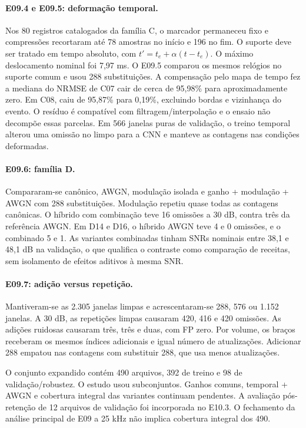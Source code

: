 \documentclass[11pt,a4paper]{article}
\begin{document}
\paragraph{E09.4 e E09.5: deformação temporal.} Nos 80 registros catalogados da família C, o marcador permaneceu fixo e compressões recortaram até 78 amostras no início e 196 no fim. O suporte deve ser tratado em tempo absoluto, com $t'=t_e+\alpha(t-t_e)$. O máximo deslocamento nominal foi 7,97 ms. O E09.5 comparou os mesmos relógios no suporte comum e usou 288 substituições. A compensação pelo mapa de tempo fez a mediana do NRMSE de C07 cair de cerca de 95,98\% para aproximadamente zero. Em C08, caiu de 95,87\% para 0,19\%, excluindo bordas e vizinhança do evento. O resíduo é compatível com filtragem/interpolação e o ensaio não decompõe essas parcelas. Em 566 janelas puras de validação, o treino temporal alterou uma omissão no limpo para a CNN e manteve as contagens nas condições deformadas.

\paragraph{E09.6: família D.} Compararam-se canônico, AWGN, modulação isolada e ganho + modulação + AWGN com 288 substituições. Modulação repetiu quase todas as contagens canônicas. O híbrido com combinação teve 16 omissões a 30 dB, contra três da referência AWGN. Em D14 e D16, o híbrido AWGN teve 4 e 0 omissões, e o combinado 5 e 1. As variantes combinadas tinham SNRs nominais entre 38,1 e 48,1 dB na validação, o que qualifica o contraste como comparação de receitas, sem isolamento de efeitos aditivos à mesma SNR.

\paragraph{E09.7: adição versus repetição.} Mantiveram-se as 2.305 janelas limpas e acrescentaram-se 288, 576 ou 1.152 janelas. A 30 dB, as repetições limpas causaram 420, 416 e 420 omissões. As adições ruidosas causaram três, três e duas, com FP zero. Por volume, os braços receberam os mesmos índices adicionais e igual número de atualizações. Adicionar 288 empatou nas contagens com substituir 288, que usa menos atualizações.

O conjunto expandido contém 490 arquivos, 392 de treino e 98 de validação/robustez. O estudo usou subconjuntos. Ganhos comuns, temporal + AWGN e cobertura integral das variantes continuam pendentes. A avaliação pós-retenção de 12 arquivos de validação foi incorporada no E10.3. O fechamento da análise principal de E09 a 25 kHz não implica cobertura integral dos 490.
\end{document}
